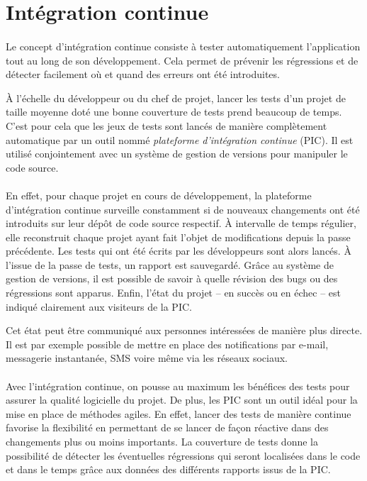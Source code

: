 \section{Intégration continue}

\paragraph{}
Le concept d'intégration continue consiste à tester automatiquement l'application tout au long de son développement.
Cela permet de prévenir les régressions et de détecter facilement où et quand des erreurs ont été introduites.

À l'échelle du développeur ou du chef de projet, lancer les tests d'un projet de taille moyenne doté une bonne couverture de tests prend beaucoup de temps.
C'est pour cela que les jeux de tests sont lancés de manière complètement automatique par un outil nommé \emph{plateforme d'intégration continue} (PIC).
Il est utilisé conjointement avec un système de gestion de versions pour manipuler le code source.

\paragraph{}
En effet, pour chaque projet en cours de développement, la plateforme d'intégration continue surveille constamment si de nouveaux changements ont été introduits sur leur dépôt de code source respectif.
À intervalle de temps régulier, elle reconstruit chaque projet ayant fait l'objet de modifications depuis la passe précédente.
Les tests qui ont été écrits par les développeurs sont alors lancés.
À l'issue de la passe de tests, un rapport est sauvegardé.
Grâce au système de gestion de versions, il est possible de savoir à quelle révision des bugs ou des régressions sont apparus.
 Enfin, l'état du projet -- en succès ou en échec -- est indiqué clairement aux visiteurs de la PIC.

Cet état peut être communiqué aux personnes intéressées de manière plus directe.
Il est par exemple possible de mettre en place des notifications par e-mail, messagerie instantanée, SMS voire même via les réseaux sociaux.

\paragraph{}
Avec l'intégration continue, on pousse au maximum les bénéfices des tests pour assurer la qualité logicielle du projet.
De plus, les PIC sont un outil idéal pour la mise en place de méthodes agiles.
En effet, lancer des tests de manière continue favorise la flexibilité en permettant de se lancer de façon réactive dans des changements plus ou moins importants.
La couverture de tests donne la possibilité de détecter les éventuelles régressions qui seront localisées dans le code et dans le temps grâce aux données des différents rapports issus de la PIC.



